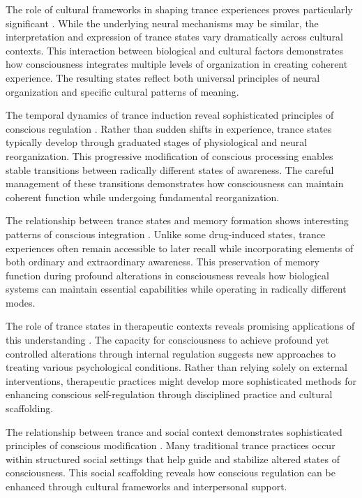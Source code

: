 \begin{refsection}
The role of cultural frameworks in shaping trance experiences proves particularly significant \cite{Lewis2003}. While the underlying neural mechanisms may be similar, the interpretation and expression of trance states vary dramatically across cultural contexts. This interaction between biological and cultural factors demonstrates how consciousness integrates multiple levels of organization in creating coherent experience. The resulting states reflect both universal principles of neural organization and specific cultural patterns of meaning.

The temporal dynamics of trance induction reveal sophisticated principles of conscious regulation \cite{Turner1992}. Rather than sudden shifts in experience, trance states typically develop through graduated stages of physiological and neural reorganization. This progressive modification of conscious processing enables stable transitions between radically different states of awareness. The careful management of these transitions demonstrates how consciousness can maintain coherent function while undergoing fundamental reorganization.

The relationship between trance states and memory formation shows interesting patterns of conscious integration \cite{Jilek1982}. Unlike some drug-induced states, trance experiences often remain accessible to later recall while incorporating elements of both ordinary and extraordinary awareness. This preservation of memory function during profound alterations in consciousness reveals how biological systems can maintain essential capabilities while operating in radically different modes.

The role of trance states in therapeutic contexts reveals promising applications of this understanding \cite{Crapanzano1973}. The capacity for consciousness to achieve profound yet controlled alterations through internal regulation suggests new approaches to treating various psychological conditions. Rather than relying solely on external interventions, therapeutic practices might develop more sophisticated methods for enhancing conscious self-regulation through disciplined practice and cultural scaffolding.

The relationship between trance and social context demonstrates sophisticated principles of conscious modification \cite{Houseman1998}. Many traditional trance practices occur within structured social settings that help guide and stabilize altered states of consciousness. This social scaffolding reveals how conscious regulation can be enhanced through cultural frameworks and interpersonal support.


\end{refsection}
